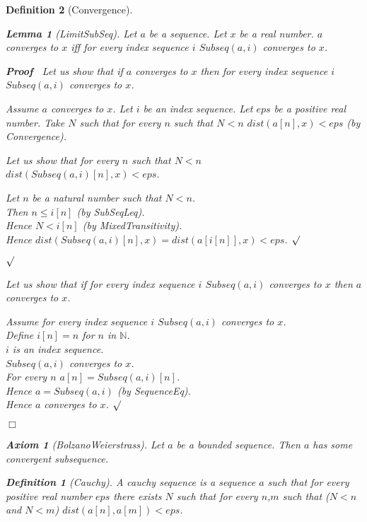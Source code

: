 \documentclass{article}
\newenvironment{forthel}{\begin{leftbar}}{\end{leftbar}}
\newenvironment{proof}{\noindent\textbf{Proof\ }}{\hspace*{\fill}$\Box$\medskip}
\newenvironment{subproof}{\begin{list}{}{}
		\item[\text{Proof}]}{\hfill $\surd$ \end{list}}
\newtheorem{axiom}{Axiom}
\newtheorem{lemma}{Lemma}
\newtheorem{definition}{Definition}
\newcommand{\NN}{\mathbb{N}}
\begin{document}
\begin{forthel}
\begin{definition}[Convergence]
	\begin{lemma}[LimitSubSeq]
		Let $a$ be a sequence. Let $x$ be a real number. $a$ converges to $x$ iff for every index sequence $i$ $Subseq(a,i)$ converges to $x$. 
	\end{lemma}
	\begin{proof}
		Let us show that if $a$ converges to $x$ then for every index sequence $i$ $Subseq(a,i)$ converges to $x$.
		
		\begin{subproof}
			Assume $a$ converges to $x$. 
			Let $i$ be an index sequence.
			Let $eps$ be a positive real number.
			Take $N$ such that for every $n$ such that $N < n$ $dist(a[n],x) < eps$ (by Convergence).
			
			Let us show that for every $n$ such that $N < n$ \\ $dist(Subseq(a,i)[n],x) < eps$.
			\begin{subproof}
				Let $n$ be a natural number such that $N < n$.\\
				Then $n \leq i[n]$ (by SubSeqLeq).\\
				Hence $N < i[n]$ (by MixedTransitivity).\\
				Hence $dist(Subseq(a,i)[n],x) = dist(a[i[n]],x) < eps$.
			\end{subproof}
		\end{subproof}
		Let us show that if for every index sequence $i$ $Subseq(a,i)$ converges to $x$ then $a$ converges to $x$.
		\begin{subproof}
			Assume for every index sequence $i$ $Subseq(a,i)$ converges to $x$. \\
			Define $i[n] = n$ for $n$ in $\NN$.\\
			$i$ is an index sequence.\\
			$Subseq(a,i)$ converges to $x$. \\
			For every $n$ $a[n] = Subseq(a,i)[n]$. \\
			Hence $a = Subseq(a,i)$ (by SequenceEq). \\
			Hence $a$ converges to $x$.
		\end{subproof}
	\end{proof}
	
	\begin{axiom}[BolzanoWeierstrass]
		Let $a$ be a bounded sequence. Then $a$ has some convergent subsequence. 
	\end{axiom}
	
	\begin{definition}[Cauchy]
		A cauchy sequence is a sequence $a$ such that for every positive real number $eps$ there exists $N$ such that
		for every $n$,$m$ such that ($N < n$ and $N < m$) $dist(a[n],a[m]) < eps$.
	\end{definition}
	

\end{definition}
\end{forthel}
\end{document}
